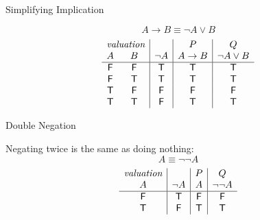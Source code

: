 \documentclass[xetex,aspectratio=169,14pt,hyperref={pdfpagelabels=true,pdflang={en-GB}}]{beamer}
\begin{document}
\begin{frame}
  {Simplifying Implication}

  \begin{displaymath}
    A \to B \equiv \lnot A \lor B
  \end{displaymath}
  \medskip
  \begin{displaymath}
    \begin{array}{cc|c|c|c}
      \multicolumn{2}{c|}{\textit{valuation}}&&P&Q \\
      A & B & \lnot A & A \to B & \lnot A \lor B \\
      \hline
      \false & \false & \true  & \true  & \true \\
      \false & \true  & \true  & \true  & \true \\
      \true  & \false & \false & \false & \false \\
      \true  & \true  & \false & \true  & \true
    \end{array}
  \end{displaymath}
\end{frame}

\begin{frame}[t]
  {Double Negation}

  Negating twice is the same as doing nothing:
  \begin{displaymath}
    A \equiv \lnot\lnot A
  \end{displaymath}
  \begin{displaymath}
    \begin{array}{c|c|c|c}
      \textit{valuation} & & P & Q \\
      A&\lnot A&A&\lnot \lnot A \\
      \hline
      \mathsf{F}&\mathsf{T}&\mathsf{F}&\mathsf{F} \\
      \mathsf{T}&\mathsf{F}&\mathsf{T}&\mathsf{T}
    \end{array}
  \end{displaymath}
\end{frame}
\end{document}
